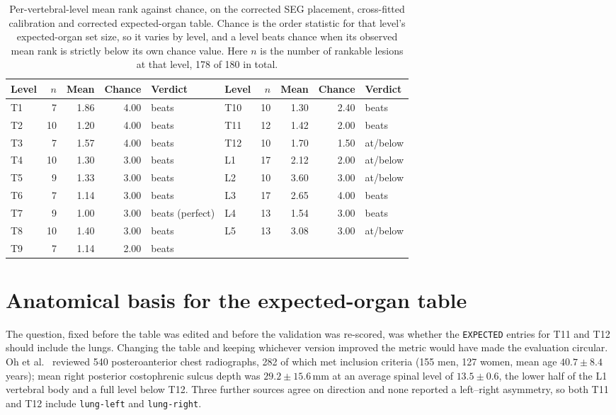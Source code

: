 \documentclass[10pt]{article}
\newcommand{\org}[1]{\texttt{#1}}
\newcommand{\code}[1]{\texttt{#1}}
\begin{document}
\begin{table}[H]
\centering
\small
\caption{Per-vertebral-level mean rank against chance, on the corrected SEG
placement, cross-fitted calibration and corrected expected-organ table.
Chance is the order statistic for that level's expected-organ set size, so it
varies by level, and a level beats chance when its observed mean rank is strictly
below its own chance value. Here $n$ is the number of rankable lesions at that
level, 178 of 180 in total.}
\label{tab:perlevel}
\begin{tabular}{lrrrl@{\hskip 2.5em}lrrrl}
\toprule
Level & $n$ & Mean & Chance & Verdict & Level & $n$ & Mean & Chance & Verdict \\
\midrule
T1  &  7 & 1.86 & 4.00 & beats           & T10 & 10 & 1.30 & 2.40 & beats \\
T2  & 10 & 1.20 & 4.00 & beats           & T11 & 12 & 1.42 & 2.00 & beats \\
T3  &  7 & 1.57 & 4.00 & beats           & T12 & 10 & 1.70 & 1.50 & at/below \\
T4  & 10 & 1.30 & 3.00 & beats           & L1  & 17 & 2.12 & 2.00 & at/below \\
T5  &  9 & 1.33 & 3.00 & beats           & L2  & 10 & 3.60 & 3.00 & at/below \\
T6  &  7 & 1.14 & 3.00 & beats           & L3  & 17 & 2.65 & 4.00 & beats \\
T7  &  9 & 1.00 & 3.00 & beats (perfect) & L4  & 13 & 1.54 & 3.00 & beats \\
T8  & 10 & 1.40 & 3.00 & beats           & L5  & 13 & 3.08 & 3.00 & at/below \\
T9  &  7 & 1.14 & 2.00 & beats           &     &    &      &      & \\
\bottomrule
\end{tabular}
\end{table}

\section{Anatomical basis for the expected-organ table}
\label{app:anatomy}

The question, fixed before the table was edited and before the validation was
re-scored, was whether the \code{EXPECTED} entries for T11 and T12 should include
the lungs. Changing the table and keeping whichever version improved the metric
would have made the evaluation circular. Oh et al.\
\cite{oh2009retrodiaphragmatic} reviewed 540 posteroanterior chest radiographs,
282 of which met inclusion criteria (155 men, 127 women, mean age
$40.7\pm8.4$ years); mean right posterior costophrenic sulcus depth was
$29.2\pm15.6$\,mm at an average spinal level of $13.5\pm0.6$, the lower half of
the L1 vertebral body and a full level below T12. Three further sources agree on
direction and none reported a left--right asymmetry, so both T11 and T12 include
\org{lung-left} and \org{lung-right}.
\end{document}
